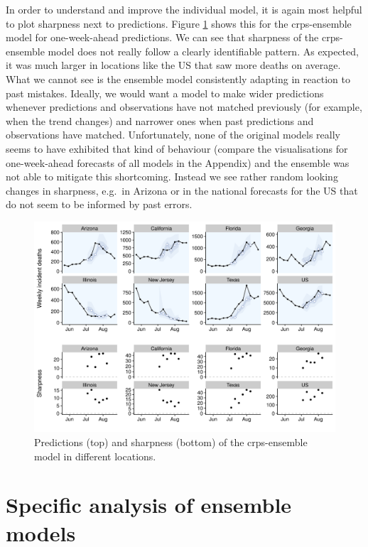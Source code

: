 \documentclass[
]{book}
\begin{document}
In order to understand and improve the individual model, it is again most helpful to plot sharpness next to predictions. Figure \ref{fig:sharpness-crps-ensemble} shows this for the crps-ensemble model for one-week-ahead predictions. We can see that sharpness of the crps-ensemble model does not really follow a clearly identifiable pattern. As expected, it was much larger in locations like the US that saw more deaths on average. What we cannot see is the ensemble model consistently adapting in reaction to past mistakes. Ideally, we would want a model to make wider predictions whenever predictions and observations have not matched previously (for example, when the trend changes) and narrower ones when past predictions and observations have matched. Unfortunately, none of the original models really seems to have exhibited that kind of behaviour (compare the visualisations for one-week-ahead forecasts of all models in the Appendix) and the ensemble was not able to mitigate this shortcoming. Instead we see rather random looking changes in sharpness, e.g.~in Arizona or in the national forecasts for the US that do not seem to be informed by past errors.

\begin{figure}
\includegraphics[width=1\linewidth]{../visualisation/chapter-5-results/scenario-baseline/sharpness-predictions-ensemble} \caption{Predictions (top) and sharpness (bottom) of the crps-ensemble model in different locations.}\label{fig:sharpness-crps-ensemble}
\end{figure}

\hypertarget{ensemble-models}{%
\section{Specific analysis of ensemble models}\label{ensemble-models}}
\end{document}
